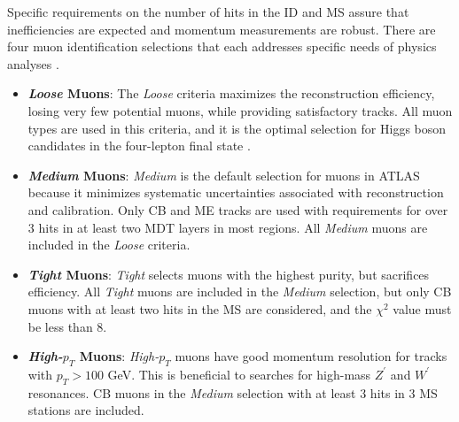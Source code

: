 Specific requirements on the number of hits in the ID and MS assure that inefficiencies are expected and momentum measurements are robust. There are four muon identification selections that each addresses specific needs of physics analyses \cite{MCPpaper}.

\begin{itemize}
\item \textbf{\textit{Loose} Muons}: The \textit{Loose} criteria maximizes the reconstruction efficiency, losing very few potential muons, while providing satisfactory tracks. All muon types are used in this criteria, and it is the optimal selection for Higgs boson candidates in the four-lepton final state \cite{4l}.
\item \textbf{\textit{Medium} Muons}: \textit{Medium} is the default selection for muons in ATLAS because it minimizes systematic uncertainties associated with reconstruction and calibration. Only CB and ME tracks are used with requirements for over 3 hits in at least two MDT layers in most regions. All \textit{Medium} muons are included in the \textit{Loose} criteria.
\item \textbf{\textit{Tight} Muons}: \textit{Tight} selects muons with the highest purity, but sacrifices efficiency. All \textit{Tight} muons are included in the \textit{Medium} selection, but only CB muons with at least two hits in the MS are considered, and the $\chi^2$ value must be less than $8$.  
\item \textbf{\textit{High-$p_T$} Muons}: \textit{High-$p_T$} muons have good momentum resolution for tracks with $p_T > 100$ GeV. This is beneficial to searches for high-mass $Z^\prime$ and $W^\prime$ resonances. CB muons in the \textit{Medium} selection with at least $3$ hits in $3$ MS stations are included. 
\end{itemize}

